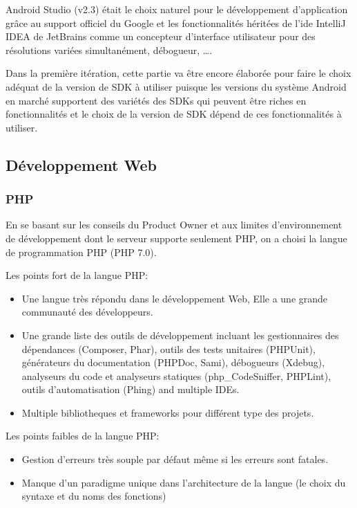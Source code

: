 Android Studio (v2.3) était le choix naturel pour le développement
d'application grâce au support officiel du Google et les fonctionnalités
héritées de l'ide IntelliJ IDEA de JetBrains comme un concepteur d'interface
utilisateur pour des résolutions variées simultanément, débogueur, \ldots.

Dans la première itération, cette partie va être encore élaborée pour faire le
choix adéquat de la version de SDK à utiliser puisque les versions du système
Android en marché supportent des variétés des SDKs qui peuvent être riches en
fonctionnalités et le choix de la version de SDK dépend de ces fonctionnalités
à utiliser.

\subsection{Développement Web}

\subsubsection{PHP}
En se basant sur les conseils du Product Owner et aux limites d'environnement
de développement dont le serveur supporte seulement PHP, on a choisi la langue
de programmation PHP (PHP 7.0).

Les points fort de la langue PHP:

\begin{itemize}
    \item Une langue très répondu dans le développement Web, Elle a une
        grande communauté des développeurs.
    \item Une grande liste des outils de développement incluant les
        gestionnaires des dépendances (Composer, Phar), outils des tests
        unitaires (PHPUnit), générateurs du documentation (PHPDoc, Sami),
        débogueurs (Xdebug), analyseurs du code et analyseurs statiques
        (php\_CodeSniffer, PHPLint), outils d'automatisation (Phing) and
        multiple IDEs.
    \item Multiple bibliotheques et frameworks pour différent type des projets.
\end{itemize}

Les points faibles de la langue PHP:

\begin{itemize}
    \item Gestion d'erreurs très souple par défaut même si les erreurs sont
        fatales.
    \item Manque d'un paradigme unique dans l'architecture de la langue (le
        choix du syntaxe et du noms des fonctions)
\end{itemize}

